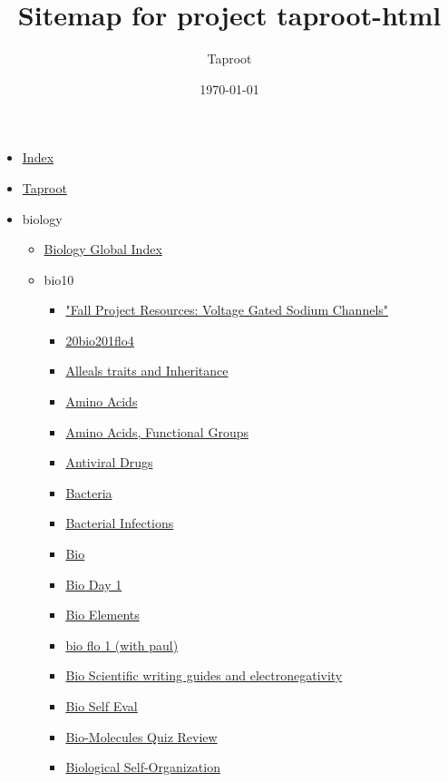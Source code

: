 \documentclass[11pt]{article}
\author{Taproot}
\date{\today}
\title{Sitemap for project taproot-html}
\begin{document}
\maketitle
\tableofcontents

\begin{itemize}
\item \href{theindex.org}{Index}
\item \href{index.org}{Taproot}
\item biology
\begin{itemize}
\item \href{biology/index.org}{Biology Global Index}
\item bio10
\begin{itemize}
\item \href{biology/bio10/KBe20bio201retFallProjectExport.org}{"Fall Project Resources: Voltage Gated Sodium Channels"}
\item \href{biology/bio10/20bio201flo4.org}{20bio201flo4}
\item \href{biology/bio10/KBhBIO101Inheritance.org}{Alleals traits and Inheritance}
\item \href{biology/bio10/KBe20bio101refAminoAcids.org}{Amino Acids}
\item \href{biology/bio10/KBhBIO101AminoAcids.org}{Amino Acids, Functional Groups}
\item \href{biology/bio10/KBhBIO101AntiViralDrugs.org}{Antiviral Drugs}
\item \href{biology/bio10/KBe20bio101refBactera.org}{Bacteria}
\item \href{biology/bio10/KBhBIO101BacterialInfections.org}{Bacterial Infections}
\item \href{biology/bio10/KB20200825142200.org}{Bio}
\item \href{biology/bio10/KBe2020bio101retFreeAssociation.org}{Bio Day 1}
\item \href{biology/bio10/KBe2020bio101refElements.org}{Bio Elements}
\item \href{biology/bio10/KBe21bio101flo1.org}{bio flo 1 (with paul)}
\item \href{biology/bio10/KB20200831091126.org}{Bio Scientific writing guides and electronegativity}
\item \href{biology/bio10/KBxBioSelfEval2020.org}{Bio Self Eval}
\item \href{biology/bio10/KBhBIO101BioMoleculesQuizReview.org}{Bio-Molecules Quiz Review}
\item \href{biology/bio10/KBhBIO101SelfOrganization.org}{Biological Self-Organization}

\end{itemize}
\end{itemize}
\end{itemize}
\end{document}

